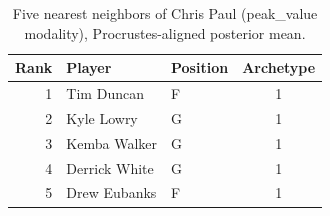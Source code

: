 \begin{table}[htbp]
  \centering\small
  \begin{tabular}{rllc}
    \toprule
    Rank & Player & Position & Archetype \\
    \midrule
    1 & Tim Duncan & F & 1 \\
    2 & Kyle Lowry & G & 1 \\
    3 & Kemba Walker & G & 1 \\
    4 & Derrick White & G & 1 \\
    5 & Drew Eubanks & F & 1 \\
    \bottomrule
  \end{tabular}
  \caption{Five nearest neighbors of Chris Paul (peak_value modality), Procrustes-aligned posterior mean.}
  \label{tab:Chris_Paul_neighbors_peak_value}
\end{table}

